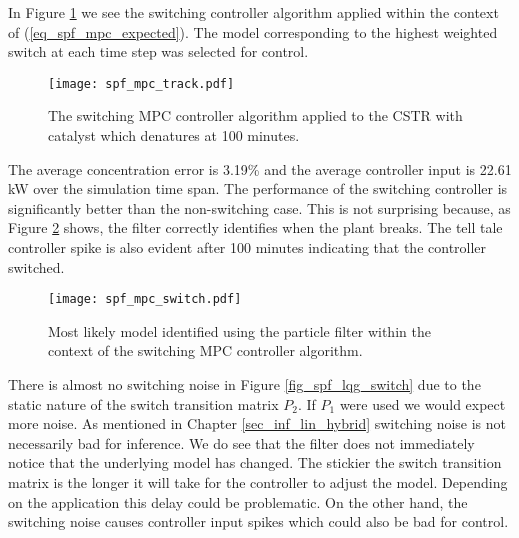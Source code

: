 In Figure \ref{fig_spf_mpc_track} we see the switching controller algorithm applied within the context of (\ref{eq_spf_mpc_expected}). The model corresponding to the highest weighted switch at each time step was selected for control.
\begin{figure}[H] 
\centering
\texttt{[image: spf\_mpc\_track.pdf]}
\caption{The switching MPC controller algorithm applied to the CSTR with catalyst which denatures at 100 minutes.}
\label{fig_spf_mpc_track}
\end{figure}
The average concentration error is 3.19\% and the average controller input is 22.61 kW over the simulation time span. The performance of the switching controller is significantly better than the non-switching case. This is not surprising because, as Figure \ref{fig_spf_mpc_switch} shows, the filter correctly identifies when the plant breaks. The tell tale controller spike is also evident after 100 minutes indicating that the controller switched.
\begin{figure}[H] 
\centering
\texttt{[image: spf\_mpc\_switch.pdf]}
\caption{Most likely model identified using the particle filter within the context of the switching MPC controller algorithm.}
\label{fig_spf_mpc_switch}
\end{figure}
There is almost no switching noise in Figure \ref{fig_spf_lqg_switch} due to the static nature of the switch transition matrix $P_2$. If $P_1$ were used we would expect more noise. As mentioned in Chapter \ref{sec_inf_lin_hybrid} switching noise is not necessarily bad for inference. We do see that the filter does not immediately notice that the underlying model has changed. The stickier the switch transition matrix is the longer it will take for the controller to adjust the model. Depending on the application this delay could be problematic. On the other hand, the switching noise causes controller input spikes which could also be bad for control. 

